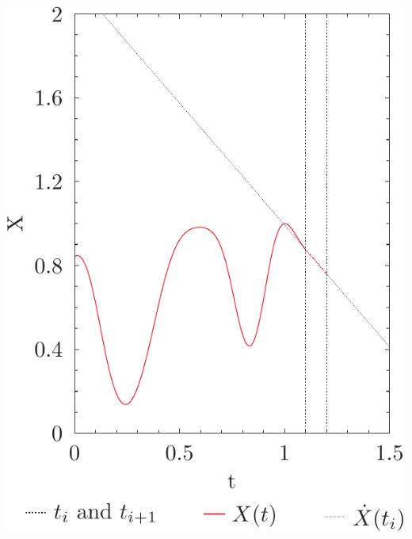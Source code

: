\documentclass{beamer}
\begin{document}
\begin{frame}
\begin{columns}
\begin{column}{0.5\linewidth}
{\includegraphics[width=\linewidth]{euler_demo1.pdf}%
}%
\end{column}
\end{columns}
\end{frame}
\end{document}

